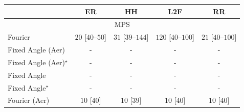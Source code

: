 \begin{tabular}{l|cccc|}
\toprule
            & ER & HH & L2F & RR \\
\midrule
\multicolumn{5}{c}{\rule{0pt}{8pt}MPS} \\
\midrule
Fourier & {\cellcolor[HTML]{F5FBF3}} \color[HTML]{000000} $20$ [$40$--$50$] & {\cellcolor[HTML]{F3FAF0}} \color[HTML]{000000} $31$ [$39$--$144$] & {\cellcolor[HTML]{DCF2D7}} \color[HTML]{000000} $120$ [$40$--$100$] & {\cellcolor[HTML]{F5FBF2}} \color[HTML]{000000} $21$ [$40$--$100$] \\
Fixed Angle (Aer) & {\cellcolor[HTML]{000000}} \color[HTML]{F1F1F1} {\cellcolor{white}} \color{black} - & {\cellcolor[HTML]{000000}} \color[HTML]{F1F1F1} {\cellcolor{white}} \color{black} - & {\cellcolor[HTML]{000000}} \color[HTML]{F1F1F1} {\cellcolor{white}} \color{black} - & {\cellcolor[HTML]{000000}} \color[HTML]{F1F1F1} {\cellcolor{white}} \color{black} - \\
Fixed Angle (Aer)$^\star$ & {\cellcolor[HTML]{000000}} \color[HTML]{F1F1F1} {\cellcolor{white}} \color{black} - & {\cellcolor[HTML]{000000}} \color[HTML]{F1F1F1} {\cellcolor{white}} \color{black} - & {\cellcolor[HTML]{000000}} \color[HTML]{F1F1F1} {\cellcolor{white}} \color{black} - & {\cellcolor[HTML]{000000}} \color[HTML]{F1F1F1} {\cellcolor{white}} \color{black} - \\
Fixed Angle & {\cellcolor[HTML]{000000}} \color[HTML]{F1F1F1} {\cellcolor{white}} \color{black} - & {\cellcolor[HTML]{000000}} \color[HTML]{F1F1F1} {\cellcolor{white}} \color{black} - & {\cellcolor[HTML]{000000}} \color[HTML]{F1F1F1} {\cellcolor{white}} \color{black} - & {\cellcolor[HTML]{000000}} \color[HTML]{F1F1F1} {\cellcolor{white}} \color{black} - \\
Fixed Angle$^\star$ & {\cellcolor[HTML]{000000}} \color[HTML]{F1F1F1} {\cellcolor{white}} \color{black} - & {\cellcolor[HTML]{000000}} \color[HTML]{F1F1F1} {\cellcolor{white}} \color{black} - & {\cellcolor[HTML]{000000}} \color[HTML]{F1F1F1} {\cellcolor{white}} \color{black} - & {\cellcolor[HTML]{000000}} \color[HTML]{F1F1F1} {\cellcolor{white}} \color{black} - \\
Fourier (Aer) & {\cellcolor[HTML]{F7FCF5}} \color[HTML]{000000} $10$ [$40$] & {\cellcolor[HTML]{F7FCF5}} \color[HTML]{000000} $10$ [$39$] & {\cellcolor[HTML]{F7FCF5}} \color[HTML]{000000} $10$ [$40$] & {\cellcolor[HTML]{F7FCF5}} \color[HTML]{000000} $10$ [$40$] \\

\end{tabular}
